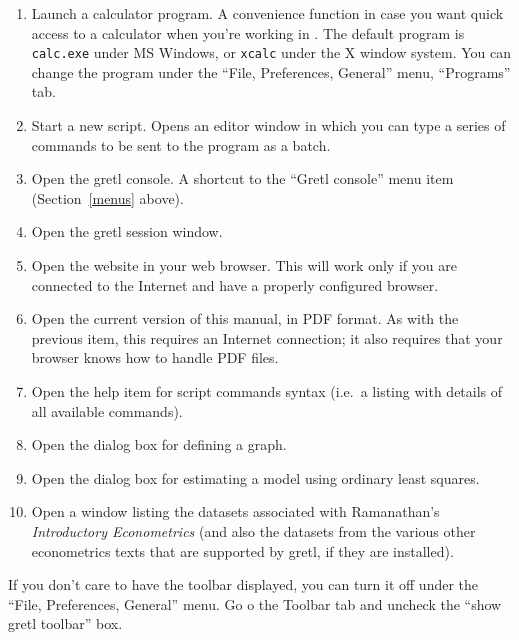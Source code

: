 \begin{enumerate}
\item Launch a calculator program.  A convenience function in case you
  want quick access to a calculator when you're working in
  .  The default program is \verb+calc.exe+ under MS
  Windows, or \verb+xcalc+ under the X window system.  You can change
  the program under the ``File, Preferences, General'' menu,
  ``Programs'' tab.
\item Start a new script.  Opens an editor window in which you can
  type a series of commands to be sent to the program as a batch.
\item Open the gretl console.  A shortcut to the ``Gretl console''
  menu item (Section~\ref{menus} above).
\item Open the gretl session window.
\item Open the  website in your web browser.  This will
  work only if you are connected to the Internet and have a properly
  configured browser.
\item Open the current version of this manual, in PDF format.  As with
  the previous item, this requires an Internet connection; it also
  requires that your browser knows how to handle PDF files.
\item Open the help item for script commands syntax (i.e.\ a listing
  with details of all available commands).
\item Open the dialog box for defining a graph.
\item Open the dialog box for estimating a model using ordinary least
  squares.
\item Open a window listing the datasets associated with Ramanathan's
  \emph{Introductory Econometrics} (and also the datasets from the
  various other econometrics texts that are supported by gretl, if
  they are installed).
\end{enumerate}

If you don't care to have the toolbar displayed, you can turn it off
under the ``File, Preferences, General'' menu. Go o the Toolbar tab
and uncheck the ``show gretl toolbar'' box.


